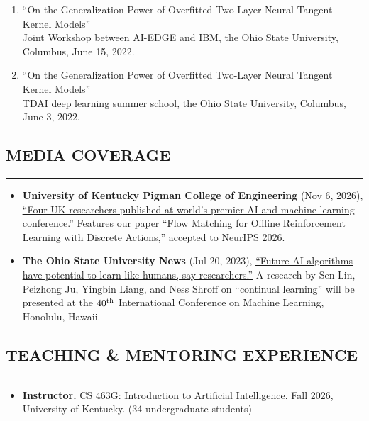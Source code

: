 \documentclass[10pt,letter]{article}
\begin{document}
\begin{small}
\begin{enumerate}[itemsep=0.5em]
    \item ``On the Generalization Power of Overfitted Two-Layer Neural Tangent Kernel Models''\\
    Joint Workshop between AI-EDGE and IBM, the Ohio State University, Columbus, June 15, 2022.
    
    \item ``On the Generalization Power of Overfitted Two-Layer Neural Tangent Kernel Models''\\
    TDAI deep learning summer school, the Ohio State University, Columbus, June 3, 2022.
\end{enumerate}


\subsection*{MEDIA COVERAGE}
\hrule
\vspace{0.2cm}

\begin{itemize}
    \item \textbf{University of Kentucky Pigman College of Engineering} (Nov 6, 2026), \href{https://engr.uky.edu/news/four-uk-researchers-published-worlds-premier-ai-and-machine-learning-conference}{\ul{``Four UK researchers published at world's premier AI and machine learning conference.''}} Features our paper ``Flow Matching for Offline Reinforcement Learning with Discrete Actions,'' accepted to NeurIPS 2026.

    \item \textbf{The Ohio State University News} (Jul 20, 2023), \href{https://news.osu.edu/future-ai-algorithms-have-potential-to-learn-like-humans-say-researchers/}{\ul{``Future AI algorithms have potential to learn like humans, say researchers.''}} A research by Sen Lin, Peizhong Ju, Yingbin Liang, and Ness Shroff on ``continual learning'' will be presented at the $40\textsuperscript{th}$ International Conference on Machine Learning, Honolulu, Hawaii.
\end{itemize}


\subsection*{TEACHING \& MENTORING EXPERIENCE}
\hrule
\vspace{0.2cm}

\begin{itemize}

\item {\bf Instructor.} CS 463G: Introduction to Artificial Intelligence. Fall 2026, University of Kentucky. (34 undergraduate students)


\end{itemize}
\end{small}
\end{document}
